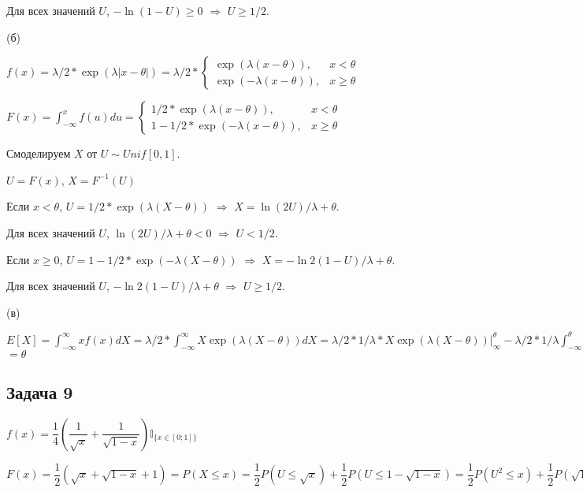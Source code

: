 \documentclass[a4paper,12pt]{article} %
\begin{document}
Для всех значений $U$, $-\ln(1-U)\geq 0$ $\Rightarrow$  $U\geq1/2$.

(б)

$f(x) = \lambda/2* \exp(\lambda|x-\theta|) = \lambda/2* \begin{cases} 
\exp(\lambda(x-\theta)), &x<\theta\\
\exp(-\lambda(x-\theta)), &x\geq\theta \end{cases} $

$F(x) = \int_{-\infty}^{x} f(u)du = \begin{cases} 
1/2* \exp(\lambda(x-\theta)), &x<\theta\\
1-1/2*\exp(-\lambda(x-\theta)), &x\geq\theta \end{cases} $ 

Смоделируем $X$ от  $U\sim Unif[0,1]$.

$U=F(x)$, $X=F^{-1}(U)$

Если $x<\theta$, $U=1/2*\exp(\lambda (X-\theta))$ $\Rightarrow$  $X=\ln(2U)/\lambda +\theta$. 

Для всех значений $U$, $\ln(2U)/\lambda +\theta<0$ $\Rightarrow$  $U<1/2$.

Если  $x\geq0$, $U=1-1/2*\exp(-\lambda (X-\theta))$ $\Rightarrow$  $X=-\ln2(1-U)/\lambda +\theta$. 

Для всех значений $U$, $-\ln2(1-U)/\lambda +\theta$ $\Rightarrow$  $U\geq1/2$.


(в)

$E[X] = \int_{-\infty}^{\infty} xf(x)dX = \lambda/2 * \int_{-\infty}^{\infty}   X \exp (\lambda(X-\theta))dX = 
\lambda/2 *1/\lambda * X \exp(\lambda(X-\theta))  \biggr\rvert_{\infty}^{\theta}-  \lambda/2 *1/\lambda \int_{-\infty}^{\theta} \exp(\lambda(X-\theta))dX -   
\lambda/2 *1/\lambda *X \exp(-\lambda(X-\theta))  \biggr\rvert^{\infty}_{\theta}+
\lambda/2 *1/\lambda \int_{\theta}^{\infty} \exp(-\lambda(X-\theta))dX  = \lambda/2 - 1/(2\lambda) * \exp(\lambda(X-\theta) ) \biggr\rvert_{\infty}^{\theta} +   \lambda/2 - 1/(2\lambda) * \exp(-\lambda(X-\theta) ) \biggr\rvert^{\infty}_{\theta} = \theta - 1/(2\lambda) +1/(2\lambda) $ $=\theta
$

\subsection*{Задача 9}

$f(x)=\dfrac{1}{4} \left( \dfrac{1}{\sqrt{x}} +  \dfrac{1}{\sqrt{1-x}}
  \right) \mathbb{I}_{\{x\in [0;1]\}} $

$F(x)=\dfrac{1}{2} ( \sqrt{x} +  \sqrt{1-x} +1) = P(X\leq x)  = \dfrac{1}{2} P(U\leq \sqrt{x}) + \dfrac{1}{2} P(U\leq 1- \sqrt{1-x})   = 
 \dfrac{1}{2} P(U^2\leq x) + \dfrac{1}{2} P(\sqrt{1-x}\leq 1-U ) =
  \dfrac{1}{2} P(U^2\leq x)  + \dfrac{1}{2} P(1-x\leq (1-U)^2 ) = 
    \dfrac{1}{2} P(U^2\leq x) +  \dfrac{1}{2} P(2U-U^2\leq x)
 $
 
\end{document}
